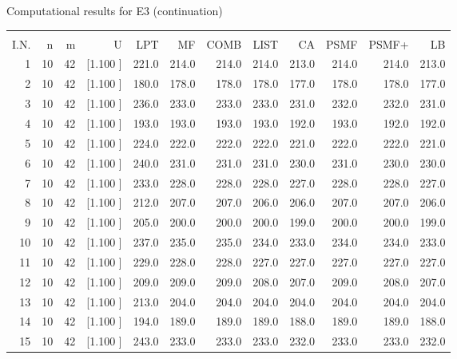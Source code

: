 \documentclass[12pt,a4paper]{article}
\begin{document}
\newpage
\begin{center}
 Computational results for E3 (continuation) {\tiny
\begin{tabular}{r r r r r r r r r r r r}\hline
    &   &   &          &        &        &        &        &        &        &        &       \\[-0.1in]
  I.N.  &  n  &  m  &  U  &  LPT  &  MF  &  COMB  &  LIST  &  CA  & PSMF &PSMF+ & LB \\[0.03in]
\hline
   1& 10& 42&[1.100     ]&   221.0&   214.0&   214.0&   214.0&   213.0&   214.0&   214.0&   213.0\\[-0.02in]
   2& 10& 42&[1.100     ]&   180.0&   178.0&   178.0&   178.0&   177.0&   178.0&   178.0&   177.0\\[-0.02in]
   3& 10& 42&[1.100     ]&   236.0&   233.0&   233.0&   233.0&   231.0&   232.0&   232.0&   231.0\\[-0.02in]
   4& 10& 42&[1.100     ]&   193.0&   193.0&   193.0&   193.0&   192.0&   193.0&   192.0&   192.0\\[-0.02in]
   5& 10& 42&[1.100     ]&   224.0&   222.0&   222.0&   222.0&   221.0&   222.0&   222.0&   221.0\\[-0.02in]
   6& 10& 42&[1.100     ]&   240.0&   231.0&   231.0&   231.0&   230.0&   231.0&   230.0&   230.0\\[-0.02in]
   7& 10& 42&[1.100     ]&   233.0&   228.0&   228.0&   228.0&   227.0&   228.0&   228.0&   227.0\\[-0.02in]
   8& 10& 42&[1.100     ]&   212.0&   207.0&   207.0&   206.0&   206.0&   207.0&   207.0&   206.0\\[-0.02in]
   9& 10& 42&[1.100     ]&   205.0&   200.0&   200.0&   200.0&   199.0&   200.0&   200.0&   199.0\\[-0.02in]
  10& 10& 42&[1.100     ]&   237.0&   235.0&   235.0&   234.0&   233.0&   234.0&   234.0&   233.0\\[-0.02in]
  11& 10& 42&[1.100     ]&   229.0&   228.0&   228.0&   227.0&   227.0&   227.0&   227.0&   227.0\\[-0.02in]
  12& 10& 42&[1.100     ]&   209.0&   209.0&   209.0&   208.0&   207.0&   209.0&   208.0&   207.0\\[-0.02in]
  13& 10& 42&[1.100     ]&   213.0&   204.0&   204.0&   204.0&   204.0&   204.0&   204.0&   204.0\\[-0.02in]
  14& 10& 42&[1.100     ]&   194.0&   189.0&   189.0&   189.0&   188.0&   189.0&   189.0&   188.0\\[-0.02in]
  15& 10& 42&[1.100     ]&   243.0&   233.0&   233.0&   233.0&   232.0&   233.0&   233.0&   232.0\\[-0.02in]

\end{tabular}}
\end{center}
\end{document}
